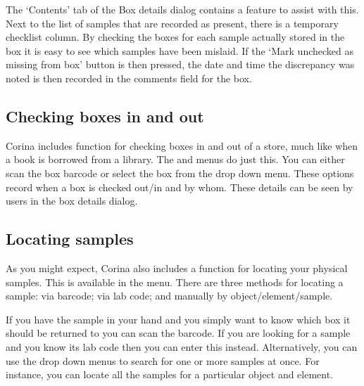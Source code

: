 The `Contents' tab of the Box details dialog contains a feature to assist with this.  Next to the list of samples that are recorded as present, there is a temporary checklist column.  By checking the boxes for each sample actually stored in the box it is easy to see which samples have been mislaid.  If the `Mark unchecked as missing from box' button is then pressed, the date and time the discrepancy was noted is then recorded in the comments field for the box.

\subsection{Checking boxes in and out}
Corina includes function for checking boxes in and out of a store, much like when a book is borrowed from a library.  The  and  menus do just this.  You can either scan the box barcode or select the box from the drop down menu.  These options record when a box is checked out/in and by whom.  These details can be seen by users in the box details dialog.

\subsection{Locating samples}
As you might expect, Corina also includes a function for locating your physical samples.  This is available in the  menu.  There are three methods for locating a sample: via barcode; via lab code; and manually by object/element/sample.  

If you have the sample in your hand and you simply want to know which box it should be returned to you can scan the barcode.  If you are looking for a sample and you know its lab code then you can enter this instead.  Alternatively, you can use the drop down menus to search for one or more samples at once.  For instance, you can locate all the samples for a particular object and element.


